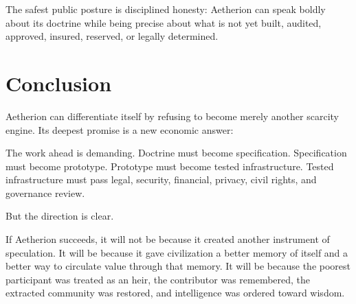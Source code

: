 \documentclass[12pt]{article}
\begin{document}
The safest public posture is disciplined honesty: Aetherion can speak boldly about its doctrine while being precise about what is not yet built, audited, approved, insured, reserved, or legally determined.

\section{Conclusion}

Aetherion can differentiate itself by refusing to become merely another scarcity engine. Its deepest promise is a new economic answer:


The work ahead is demanding. Doctrine must become specification. Specification must become prototype. Prototype must become tested infrastructure. Tested infrastructure must pass legal, security, financial, privacy, civil rights, and governance review.

But the direction is clear.

If Aetherion succeeds, it will not be because it created another instrument of speculation. It will be because it gave civilization a better memory of itself and a better way to circulate value through that memory. It will be because the poorest participant was treated as an heir, the contributor was remembered, the extracted community was restored, and intelligence was ordered toward wisdom.

\aftClosingPage
\end{document}
